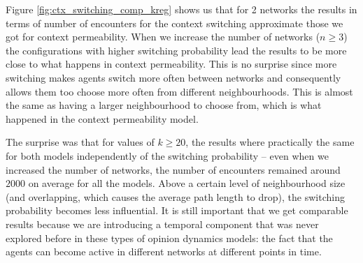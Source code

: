 \documentclass[preprint,number]{elsarticle}
\begin{document}
Figure \ref{fig:ctx_switching_comp_kreg} shows us that for 2 networks the results in terms of number of encounters for the context switching approximate those we got for context permeability. When we increase the number of networks ($n\ge3$) the configurations with higher switching probability lead the results to be more close to what happens in context permeability. This is no surprise since more switching makes agents switch more often between networks and consequently allows them too choose more often from different neighbourhoods. This is almost the same as having a larger neighbourhood to choose from, which is what happened in the context permeability model. 

The surprise was that for values of $k \ge 20$, the results where practically the same for both
models independently of the switching probability -- even when we increased the number of networks, the number of encounters remained around $2000$ on average for all the models. Above a certain level of neighbourhood size (and overlapping, which causes the average path length to drop), the switching probability becomes less influential. It is still important that we get comparable results because we are introducing a temporal component that was never explored before in these types of opinion dynamics models: the fact that the agents can become active in different networks at different points in time.
\end{document}
